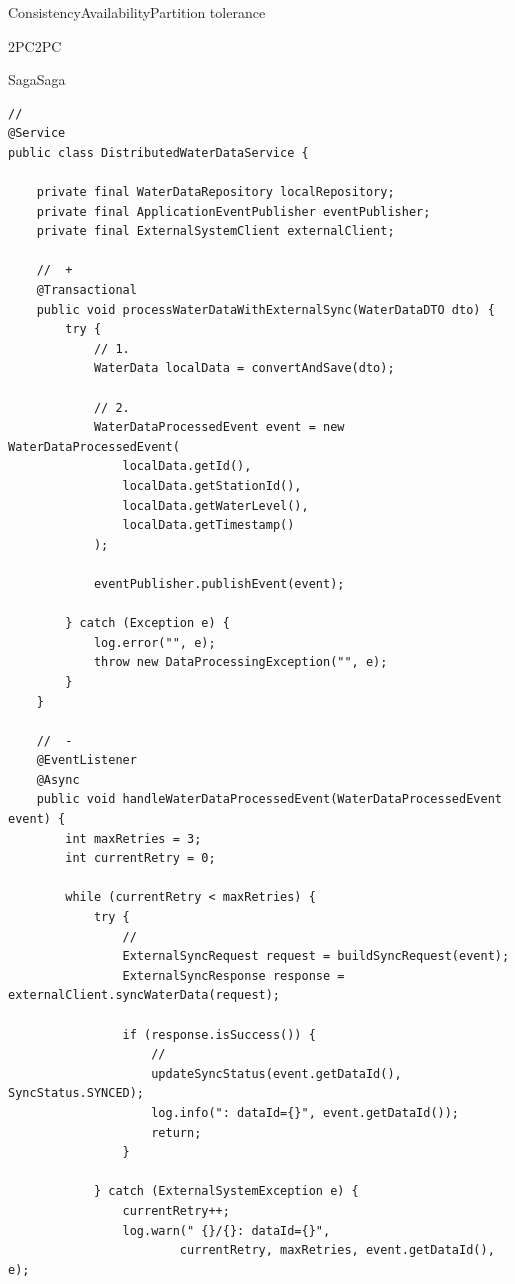 \hypertarget{section-66}{%
\subsubsection{}\label{section-66}}

ConsistencyAvailabilityPartition tolerance

2PC2PC

SagaSaga

\begin{lstlisting}[style=java]
// 
@Service
public class DistributedWaterDataService {
    
    private final WaterDataRepository localRepository;
    private final ApplicationEventPublisher eventPublisher;
    private final ExternalSystemClient externalClient;
    
    //  + 
    @Transactional
    public void processWaterDataWithExternalSync(WaterDataDTO dto) {
        try {
            // 1. 
            WaterData localData = convertAndSave(dto);
            
            // 2. 
            WaterDataProcessedEvent event = new WaterDataProcessedEvent(
                localData.getId(), 
                localData.getStationId(),
                localData.getWaterLevel(),
                localData.getTimestamp()
            );
            
            eventPublisher.publishEvent(event);
            
        } catch (Exception e) {
            log.error("", e);
            throw new DataProcessingException("", e);
        }
    }
    
    //  - 
    @EventListener
    @Async
    public void handleWaterDataProcessedEvent(WaterDataProcessedEvent event) {
        int maxRetries = 3;
        int currentRetry = 0;
        
        while (currentRetry < maxRetries) {
            try {
                // 
                ExternalSyncRequest request = buildSyncRequest(event);
                ExternalSyncResponse response = externalClient.syncWaterData(request);
                
                if (response.isSuccess()) {
                    // 
                    updateSyncStatus(event.getDataId(), SyncStatus.SYNCED);
                    log.info(": dataId={}", event.getDataId());
                    return;
                }
                
            } catch (ExternalSystemException e) {
                currentRetry++;
                log.warn(" {}/{}: dataId={}", 
                        currentRetry, maxRetries, event.getDataId(), e);
                

\end{lstlisting}
